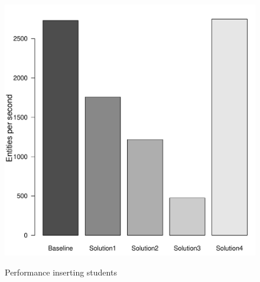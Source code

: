 \begin{figure}[H]
			{\includegraphics[width=\W]{figure/result/barplot-insert_student-tp.pdf}}
			\caption{Performance inserting students}\label{fres:insert-user}

\end{figure}
